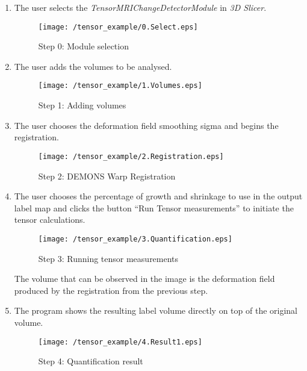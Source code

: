 \begin{enumerate}
\item The user selects the \textit{TensorMRIChangeDetectorModule} in \textit{3D Slicer}.

  \begin{figure}[H]
    \centering
    \texttt{[image: /tensor\_example/0.Select.eps]}
    \caption{Step 0: Module selection}
    \label{tensor_ex_0}
  \end{figure}
  
\item The user adds the volumes to be analysed.
  
  \begin{figure}[H]
    \centering
    \texttt{[image: /tensor\_example/1.Volumes.eps]}
    \caption{Step 1: Adding volumes}
    \label{tensor_ex_1}
  \end{figure}
  
\item The user chooses the deformation field smoothing sigma and begins the registration. 
  
  \begin{figure}[H]
    \centering
    \texttt{[image: /tensor\_example/2.Registration.eps]}
    \caption{Step 2: DEMONS Warp Registration}
    \label{tensor_ex_2}
  \end{figure}
  
  
\item  The user chooses the percentage of growth and shrinkage to
  use in the output label map and clicks the button ``Run Tensor
  measurements'' to initiate the tensor calculations.

  \begin{figure}[H]
    \centering
    \texttt{[image: /tensor\_example/3.Quantification.eps]}
    \caption{Step 3: Running tensor measurements}
    \label{tensor_ex_3}
  \end{figure}
  
  The volume that can be observed in the image is the deformation
  field produced by the registration from the previous step.

\item The program shows the resulting label volume directly on top of the original volume.
  
  \begin{figure}[H]
    \centering
    \texttt{[image: /tensor\_example/4.Result1.eps]}
    \caption{Step 4: Quantification result}
    \label{tensor_ex_4}
  \end{figure}
  

\end{enumerate}
